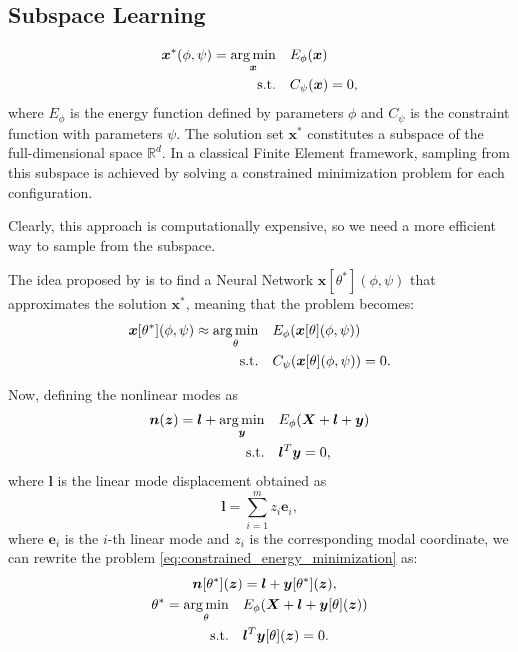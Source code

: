 \subsection{Subspace Learning}
\begin{align}
    \label{eq:constrained_energy_minimization}
    \bm{x}^*(\phi, \psi) = \underset{\bm{x}}{\operatorname*{arg\,min}} \quad & E_\phi(\bm{x}) \\
    \text{s.t.} \quad & C_\psi(\bm{x}) = 0, \nonumber
\end{align}
where \( E_\phi \) is the energy function defined by parameters \(\phi\) and \( C_\psi \) is the constraint function with parameters \(\psi\). The solution set \( \bm{x}^*\) constitutes a subspace of the full-dimensional space \( \mathbb{R}^d \). In a classical Finite Element framework, sampling from this subspace is achieved by solving a constrained minimization problem for each configuration. 

Clearly, this approach is computationally expensive, so we need a more efficient way to sample from the subspace.

The idea proposed by \cite{Wang_Du_Coros_Thomaszewski_2024} is to find a Neural Network \( \bm{x}[\theta^*](\phi, \psi) \) that approximates the solution \( \bm{x}^* \), meaning that the problem becomes:
\begin{align*}
    \bm{x}[\theta^*](\phi, \psi) \approx \underset{\theta}{\operatorname*{arg\,min}} \quad & E_\phi(\bm{x}[\theta](\phi, \psi)) \\
    \text{s.t.} \quad & C_\psi(\bm{x}[\theta](\phi, \psi)) = 0.
\end{align*}

Now, defining the nonlinear modes as 
\begin{align}
    \bm{n}(\bm{z}) = \bm{l} + \operatorname*{arg\,min}_{\bm{y}} \quad & E_\phi(\bm{X} + \bm{l} + \bm{y}) \\ 
    \text{s.t.} \quad & \bm{l}^T \bm{y} = 0,
\end{align}
where \( \bm{l} \) is the linear mode displacement obtained as
\begin{equation}
    \bm{l} = \sum_{i=1}^m z_i \bm{e}_i,
\end{equation}
where \( \bm{e}_i \) is the $i$-th linear mode and \( z_i \) is the corresponding modal coordinate, we can rewrite the problem \ref{eq:constrained_energy_minimization} as:
\begin{align*}
    \bm{n}[\theta^*](\bm{z}) &= \bm{l} + \bm{y}[\theta^*](\bm{z}), \\
    \theta^* = \underset{\theta}{\operatorname*{arg\,min}} \quad & E_\phi(\bm{X} + \bm{l} + \bm{y}[\theta](\bm{z})) \\
    \text{s.t.} \quad & \bm{l}^T \bm{y}[\theta](\bm{z}) = 0.
\end{align*}

